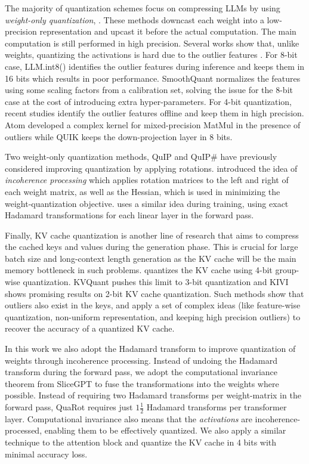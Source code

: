 
The majority of quantization schemes focus on compressing LLMs by using \textit{weight-only quantization}, \citep{gptq, spqr, awq, AQLM, QuIPsharp}. These methods downcast each weight into a low-precision representation and upcast it before the actual computation. The main computation is still performed in high precision. 
Several works show that, unlike weights, quantizing the activations is hard due to the outlier features \citep{outlier_suppression, llm_int8, smoothquant}. For 8-bit case, LLM.int8() \citep{llm_int8} identifies the outlier features during inference and keeps them in 16 bits which results in poor performance. SmoothQuant \citep{smoothquant} normalizes the features using some scaling factors from a calibration set, solving the issue for the 8-bit case at the cost of introducing extra hyper-parameters. For 4-bit quantization, recent studies identify the outlier features offline and keep them in high precision. Atom \citep{atom} developed a complex kernel for mixed-precision MatMul in the presence of outliers while QUIK \citep{quik} keeps the down-projection layer in 8 bits.


Two weight-only quantization methods, QuIP \citep{QuIP} and QuIP\# \citep{QuIPsharp} have previously considered improving quantization by applying rotations.  \citet{QuIP} introduced the idea of \emph{incoherence processing} which applies rotation matrices to the left and right of each weight matrix, as well as the Hessian, which is used in minimizing the weight-quantization objective. \citet{xi2023training} uses a similar idea during training, using exact Hadamard transformations for each linear layer in the forward pass.


Finally, KV cache quantization is another line of research that aims to compress the cached keys and values during the generation phase. This is crucial for large batch size and long-context length generation as the KV cache will be the main memory bottleneck in such problems. \citet{sheng2023flexgen} quantizes the KV cache using 4-bit group-wise quantization. KVQuant \citep{kvquant} pushes this limit to 3-bit quantization and KIVI \citep{kivi} shows promising results on 2-bit KV cache quantization. Such methods show that outliers also exist in the keys, and apply a set of complex ideas (like feature-wise quantization, non-uniform representation, and keeping high precision outliers) to recover the accuracy of a quantized KV cache.


In this work we also adopt the Hadamard transform to improve quantization of weights through incoherence processing. Instead of undoing the Hadamard transform during the forward pass, we adopt the computational invariance theorem from SliceGPT \citep{slicegpt} to fuse the transformations into the weights where possible. Instead of requiring two Hadamard transforms per weight-matrix in the forward pass, QuaRot requires just $1\tfrac{1}{2}$ Hadamard transforms per transformer layer. Computational invariance also means that the \emph{activations} are incoherence-processed, enabling them to be effectively quantized. We also apply a similar technique to the attention block and quantize the KV cache in 4 bits with minimal accuracy loss.
